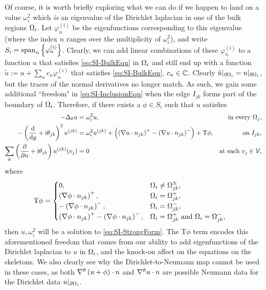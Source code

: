 Of course, it is worth briefly exploring what we can do if we happen to land on a value $\omega_i^2$ which \emph{is} an eigenvalue of the Dirichlet laplacian in one of the bulk regions $\Omega_i$.
Let $\varphi^{(i)}_n$ be the eigenfunctions corresponding to this eigenvalue (where the index $n$ ranges over the multiplicity of $\omega_i^2$), and write $S_i = \mathrm{span}_n\left\{ \varphi^{(i)}_n \right\}$.
Clearly, we can add linear combinations of these $\varphi^{(i)}_n$ to a function $u$ that satisfies \eqref{eq:SI-BulkEqn} in $\Omega_i$ and still end up with a function $\tilde{u} := u + \sum_{n}c_n\varphi^{(i)}_n$ that satisfies \eqref{eq:SI-BulkEqn}, $c_n\in\mathbb{C}$.
Clearly $\tilde{u}\vert_{\partial\Omega_i} = u\vert_{\partial\Omega_i}$, but the traces of the normal derivatives no longer match.
As such, we gain some additional ``freedom" in \eqref{eq:SI-InclusionEqn} when the edge $I_{jk}$ forms part of the boundary of $\Omega_i$.
Therefore, if there exists a $\phi\in S_i$ such that $u$ satisfies
\begin{subequations}
	\begin{align*}
		-\Delta_{\theta}u &= \omega_i^2 u, &\text{in every } \Omega_j, \\
		-\left( \dfrac{\mathrm{d}}{\mathrm{d}y} + \mathrm{i}\theta_{jk} \right)^2u^{(jk)}  
		&= \omega_i^2 u^{(jk)} + \left( \left( \nabla u\cdot n_{jk} \right)^+ - \left( \nabla u\cdot n_{jk} \right)^- \right) + \mathrm{T}\phi,
		&\text{on } I_{jk}, \\
		\sum_{k} \left( \dfrac{\partial }{\partial n}+\mathrm{i}\theta_{jk} \right) u^{(jk)}(v_j) 
		&= 0 
		&\text{at each } v_j\in\mathcal{V},
	\end{align*}
\end{subequations}
where
\begin{align*}
	\mathrm{T}\phi &=
	\begin{cases}
		0, & \Omega_i\neq\Omega_{jk}^{\pm}, \\
		\left( \nabla\phi\cdot n_{jk} \right)^+, & \Omega_i = \Omega_{jk}^+, \\
		-\left( \nabla\phi\cdot n_{jk} \right)^-, & \Omega_i = \Omega_{jk}^-, \\
		\left( \nabla\phi\cdot n_{jk} \right)^+ -\left( \nabla\phi\cdot n_{jk} \right)^-, & \Omega_i = \Omega_{jk}^+ \text{ and } \Omega_i = \Omega_{jk}^-,
	\end{cases}
\end{align*}
then $u, \omega_i^2$ will be a solution to \eqref{eq:SI-StrongForm}.
The $\mathrm{T}\phi$ term encodes this aforementioned freedom that comes from our ability to add eigenfunctions of the Dirichlet laplacian to $u$ in $\Omega_i$, and the knock-on affect on the equations on the skeletons.
We also clearly see why the Dirichlet-to-Neumann map cannot be used in these cases, as both $\nabla^{\theta}\left( u+\phi \right)\cdot n$ and $\nabla^{\theta} u\cdot n$ are possible Neumann data for the Dirichlet data $u\vert_{\partial\Omega_i}$.

